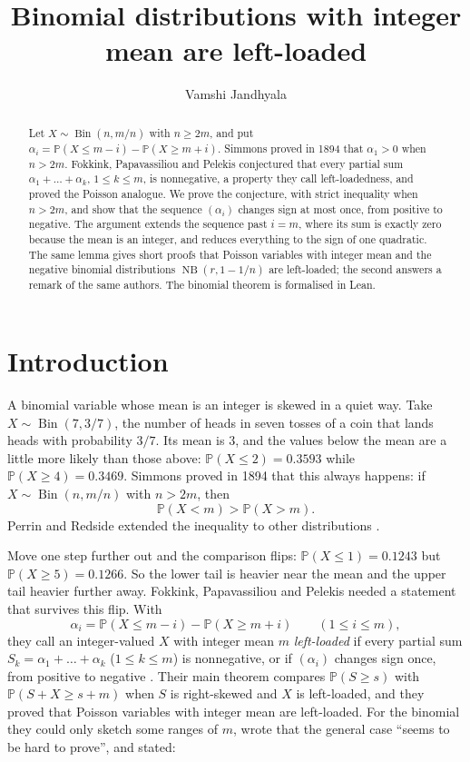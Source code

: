 \documentclass[11pt]{amsart}
\title{Binomial distributions with integer mean are left-loaded}
\author{Vamshi Jandhyala}
\date{}
\theoremstyle{definition}
\theoremstyle{remark}
\DeclareMathOperator{\Bin}{Bin}
\DeclareMathOperator{\NB}{NB}
\newcommand{\Prob}{\mathbb P}
\begin{document}
\begin{abstract}
Let $X\sim\Bin(n,m/n)$ with $n\ge 2m$, and put $\alpha_i=\Prob(X\le m-i)-\Prob(X\ge m+i)$. Simmons proved in 1894 that
$\alpha_1>0$ when $n>2m$. Fokkink, Papavassiliou and Pelekis conjectured that every partial sum
$\alpha_1+\dots+\alpha_k$, $1\le k\le m$, is nonnegative, a property they call left-loadedness, and proved the
Poisson analogue. We prove the conjecture, with strict inequality when $n>2m$, and show that the sequence $(\alpha_i)$
changes sign at most once, from positive to negative. The argument extends the sequence past $i=m$, where its sum is exactly zero because the
mean is an integer, and reduces everything to the sign of one quadratic. The same lemma gives short proofs that
Poisson variables with integer mean and the negative binomial distributions $\NB(r,1-1/n)$ are left-loaded; the second
answers a remark of the same authors. The binomial theorem is formalised in Lean.
\end{abstract}

\maketitle

\section{Introduction}

A binomial variable whose mean is an integer is skewed in a quiet way. Take $X\sim\Bin(7,3/7)$, the number of heads in
seven tosses of a coin that lands heads with probability $3/7$. Its mean is $3$, and the values below the mean are a
little more likely than those above: $\Prob(X\le2)=0.3593$ while $\Prob(X\ge4)=0.3469$. Simmons proved in
1894 \cite{Simmons} that this always happens: if $X\sim\Bin(n,m/n)$ with $n>2m$, then
\begin{equation}\label{eq:simmons}
\Prob(X<m)>\Prob(X>m).
\end{equation}
Perrin and Redside extended the inequality to other distributions \cite{PR}.

Move one step further out and the comparison flips: $\Prob(X\le1)=0.1243$ but $\Prob(X\ge5)=0.1266$. So the lower
tail is heavier near the mean and the upper tail heavier further away. Fokkink, Papavassiliou and Pelekis \cite{FPP}
needed a statement that survives this flip. With
\[
\alpha_i=\Prob(X\le m-i)-\Prob(X\ge m+i)\qquad(1\le i\le m),
\]
they call an integer-valued $X$ with integer mean $m$ \emph{left-loaded} if every partial sum
$S_k=\alpha_1+\dots+\alpha_k$ ($1\le k\le m$) is nonnegative, or if $(\alpha_i)$ changes sign once, from positive to
negative \cite[Definition 1.2]{FPP}. Their main theorem compares $\Prob(S\ge s)$ with $\Prob(S+X\ge s+m)$ when $S$ is
right-skewed and $X$ is left-loaded, and they proved that Poisson variables with integer mean are left-loaded. For the
binomial they could only sketch some ranges of $m$, wrote that the general case ``seems to be hard to prove'', and
stated:
\end{document}
